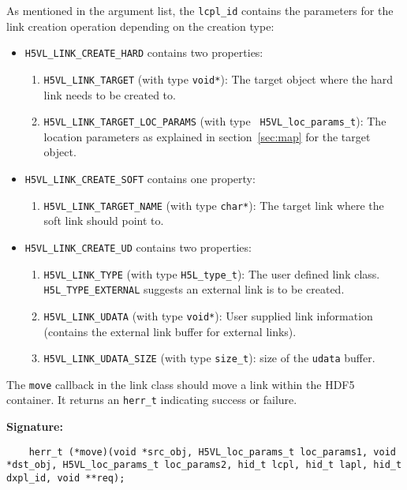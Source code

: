 As mentioned in the argument list, the {\tt lcpl\_id} contains the
parameters for the link creation operation depending on the creation
type:
\begin{itemize}
\item {\tt H5VL\_LINK\_CREATE\_HARD} contains two properties:
  \begin{enumerate}
  \item {\tt H5VL\_LINK\_TARGET} (with type {\tt void*}): The target
    object where the hard link needs to be created to.
  \item {\tt H5VL\_LINK\_TARGET\_LOC\_PARAMS} (with type {\tt
      H5VL\_loc\_params\_t}): The location parameters as explained in
    section~\ref{sec:map} for the target object.
  \end{enumerate}

\item {\tt H5VL\_LINK\_CREATE\_SOFT} contains one property:
  \begin{enumerate}
  \item {\tt H5VL\_LINK\_TARGET\_NAME} (with type {\tt char*}): The target
    link where the soft link should point to.
  \end{enumerate}

\item {\tt H5VL\_LINK\_CREATE\_UD} contains two properties:
  \begin{enumerate}
  \item {\tt H5VL\_LINK\_TYPE} (with type {\tt H5L\_type\_t}): The
    user defined link class. {\tt H5L\_TYPE\_EXTERNAL} suggests an
    external link is to be created.
  \item {\tt H5VL\_LINK\_UDATA} (with type {\tt void*}): User supplied
    link information (contains the external link buffer for external
    links). 
  \item {\tt H5VL\_LINK\_UDATA\_SIZE} (with type {\tt size\_t}): size
    of the {\tt udata} buffer. 
  \end{enumerate}
\end{itemize}

The {\tt move} callback in the link class should move a link within the HDF5 container. It returns an {\tt herr\_t} indicating success or failure.

\textbf{Signature:}
\begin{lstlisting}
    herr_t (*move)(void *src_obj, H5VL_loc_params_t loc_params1, void *dst_obj, H5VL_loc_params_t loc_params2, hid_t lcpl, hid_t lapl, hid_t dxpl_id, void **req);
\end{lstlisting}

